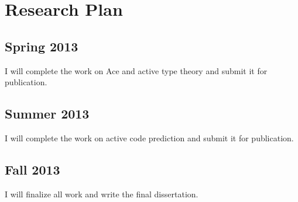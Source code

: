 \section{Research Plan}

\subsection{Spring 2013}
I will complete the work on Ace and active type theory and submit it for publication.

\subsection{Summer 2013}
I will complete the work on active code prediction and submit it for publication.

\subsection{Fall 2013}
I will finalize all work and write the final dissertation.